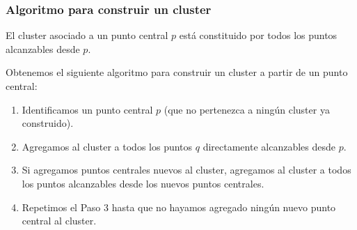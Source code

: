 \documentclass[aspectratio=169,12pt]{beamer}
\begin{document}


\begin{frame}
\frametitle{Algoritmo para construir un cluster}

El cluster asociado a un punto central $p$ está constituido por todos los puntos alcanzables desde $p$.

Obtenemos el siguiente algoritmo para construir un cluster a partir de un punto central:
\begin{enumerate}
\item Identificamos un punto central $p$ (que no pertenezca a ningún cluster ya construido).
\item Agregamos al cluster a todos los puntos $q$ directamente alcanzables desde $p$.
\item Si agregamos puntos centrales nuevos al cluster, agregamos al cluster a todos los puntos alcanzables desde los nuevos puntos centrales.
\item Repetimos el Paso 3 hasta que no hayamos agregado ningún nuevo punto central al cluster.
\end{enumerate}

\end{frame}

\end{document}
